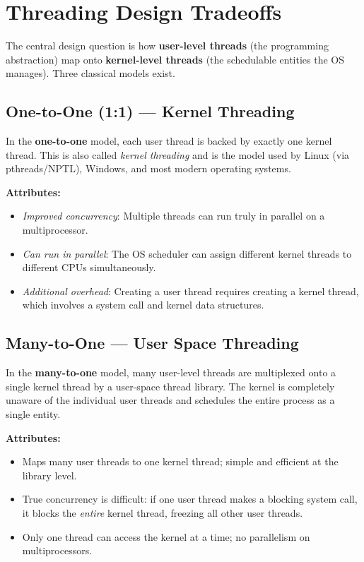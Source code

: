 \documentclass[11pt]{article}
\begin{document}
\section{Threading Design Tradeoffs}

The central design question is how \textbf{user-level threads} (the programming abstraction) map onto \textbf{kernel-level threads} (the schedulable entities the OS manages). Three classical models exist.

\subsection{One-to-One (1:1) --- Kernel Threading}

In the \textbf{one-to-one} model, each user thread is backed by exactly one kernel thread. This is also called \emph{kernel threading} and is the model used by Linux (via pthreads/NPTL), Windows, and most modern operating systems.

\textbf{Attributes:}
\begin{itemize}
    \item \emph{Improved concurrency}: Multiple threads can run truly in parallel on a multiprocessor.
    \item \emph{Can run in parallel}: The OS scheduler can assign different kernel threads to different CPUs simultaneously.
    \item \emph{Additional overhead}: Creating a user thread requires creating a kernel thread, which involves a system call and kernel data structures.
\end{itemize}

\subsection{Many-to-One --- User Space Threading}

In the \textbf{many-to-one} model, many user-level threads are multiplexed onto a single kernel thread by a user-space thread library. The kernel is completely unaware of the individual user threads and schedules the entire process as a single entity.

\textbf{Attributes:}
\begin{itemize}
    \item Maps many user threads to one kernel thread; simple and efficient at the library level.
    \item True concurrency is difficult: if one user thread makes a blocking system call, it blocks the \emph{entire} kernel thread, freezing all other user threads.
    \item Only one thread can access the kernel at a time; no parallelism on multiprocessors.
\end{itemize}
\end{document}
